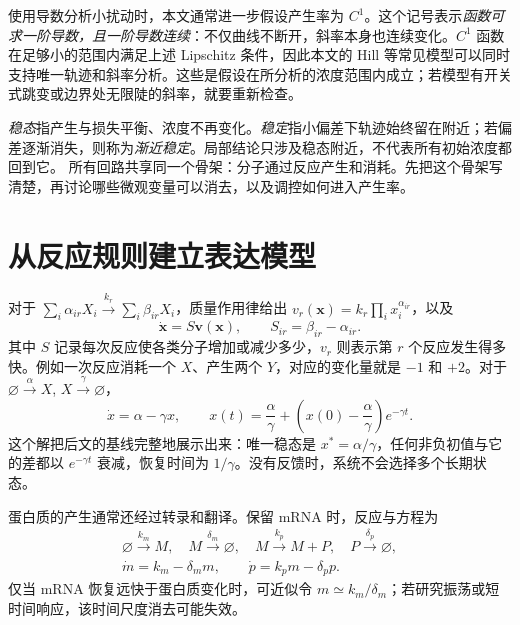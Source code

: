 使用导数分析小扰动时，本文通常进一步假设产生率为 $C^1$。这个记号表示\emph{函数可求一阶导数，且一阶导数连续}：不仅曲线不断开，斜率本身也连续变化。$C^1$ 函数在足够小的范围内满足上述 Lipschitz 条件，因此本文的 Hill 等常见模型可以同时支持唯一轨迹和斜率分析。这些是假设在所分析的浓度范围内成立；若模型有开关式跳变或边界处无限陡的斜率，就要重新检查。

\emph{稳态}指产生与损失平衡、浓度不再变化。\emph{稳定}指小偏差下轨迹始终留在附近；若偏差逐渐消失，则称为\emph{渐近稳定}。局部结论只涉及稳态附近，不代表所有初始浓度都回到它。
所有回路共享同一个骨架：分子通过反应产生和消耗。先把这个骨架写清楚，再讨论哪些微观变量可以消去，以及调控如何进入产生率。
\section{从反应规则建立表达模型}
对于 $\sum_i\alpha_{ir}X_i\xrightarrow{k_r}\sum_i\beta_{ir}X_i$，质量作用律给出 $v_r(\bm x)=k_r\prod_i x_i^{\alpha_{ir}}$，以及
\begin{equation}\dot{\bm x}=S\bm v(\bm x),\qquad S_{ir}=\beta_{ir}-\alpha_{ir}.\end{equation}
其中 $S$ 记录每次反应使各类分子增加或减少多少，$v_r$ 则表示第 $r$ 个反应发生得多快。例如一次反应消耗一个 $X$、产生两个 $Y$，对应的变化量就是 $-1$ 和 $+2$。对于 $\varnothing\xrightarrow{\alpha}X$, $X\xrightarrow{\gamma}\varnothing$，
\begin{equation}\dot x=\alpha-\gamma x,\qquad x(t)=\frac\alpha\gamma+\left(x(0)-\frac\alpha\gamma\right)e^{-\gamma t}.\end{equation}
这个解把后文的基线完整地展示出来：唯一稳态是 $x^*=\alpha/\gamma$，任何非负初值与它的差都以 $e^{-\gamma t}$ 衰减，恢复时间为 $1/\gamma$。没有反馈时，系统不会选择多个长期状态。


蛋白质的产生通常还经过转录和翻译。保留 mRNA 时，反应与方程为
\begin{align}
\varnothing\xrightarrow{k_m}M,\quad M\xrightarrow{\delta_m}\varnothing,\quad M\xrightarrow{k_p}M+P,\quad P\xrightarrow{\delta_p}\varnothing,\\[-2pt]
\dot m=k_m-\delta_m m,\qquad\dot p=k_pm-\delta_p p.
\end{align}
仅当 mRNA 恢复远快于蛋白质变化时，可近似令 $m\simeq k_m/\delta_m$；若研究振荡或短时间响应，该时间尺度消去可能失效。

